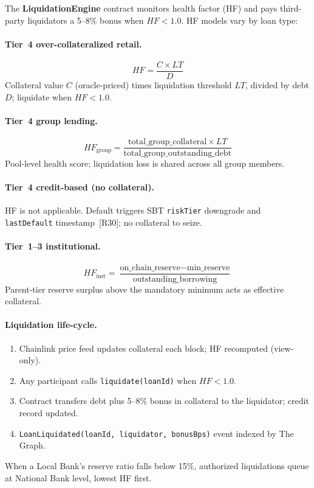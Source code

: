 \documentclass[12pt,a4paper]{report}
\begin{document}
The \textbf{LiquidationEngine} contract monitors health factor (HF) and pays third-party liquidators a 5--8\% bonus when $HF < 1.0$. HF models vary by loan type:

\paragraph{Tier~4 over-collateralized retail.}
\begin{equation}
HF = \frac{C \times LT}{D}
\end{equation}
\noindent Collateral value $C$ (oracle-priced) times liquidation threshold $LT$, divided by debt $D$; liquidate when $HF < 1.0$.

\paragraph{Tier~4 group lending.}
\begin{equation}
HF_{\text{group}} = \frac{\text{total\_group\_collateral} \times LT}{\text{total\_group\_outstanding\_debt}}
\end{equation}
\noindent Pool-level health score; liquidation loss is shared across all group members.

\paragraph{Tier~4 credit-based (no collateral).}
HF is not applicable. Default triggers SBT \texttt{riskTier} downgrade and \texttt{lastDefault} timestamp~[R30]; no collateral to seize.

\paragraph{Tier~1--3 institutional.}
\begin{equation}
HF_{\text{inst}} = \frac{\text{on\_chain\_reserve} - \text{min\_reserve}}{\text{outstanding\_borrowing}}
\end{equation}
\noindent Parent-tier reserve surplus above the mandatory minimum acts as effective collateral.

\paragraph{Liquidation life-cycle.}
\begin{enumerate}[noitemsep]
\item Chainlink price feed updates collateral each block; HF recomputed (view-only).
\item Any participant calls \texttt{liquidate(loanId)} when $HF < 1.0$.
\item Contract transfers debt plus 5--8\% bonus in collateral to the liquidator; credit record updated.
\item \texttt{LoanLiquidated(loanId, liquidator, bonusBps)} event indexed by The Graph.
\end{enumerate}
\noindent When a Local Bank's reserve ratio falls below 15\%, authorized liquidations queue at National Bank level, lowest HF first.
\end{document}
